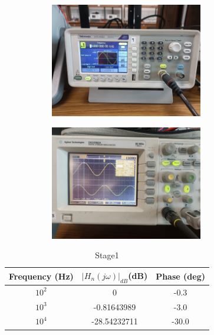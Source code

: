 \documentclass[a4paper,12pt]{article}
\begin{document}
\begin{figure}[H]
    \centering
    \begin{subfigure}{0.5\textwidth}
        \centering
        \includegraphics[height=5cm]{figs/Stage1/10000/para.jpeg}
    \end{subfigure}%
    \begin{subfigure}{0.5\textwidth}
        \centering
        \includegraphics[height=5cm]{figs/Stage1/10000/plot.jpeg}
    \end{subfigure}
\end{figure}
\begin{table}[H]
    \centering
    \begin{tabular}{|c|c|c|}
        \hline
        Frequency (Hz) &  $|H_n(j\omega)|_{dB}$(dB) & Phase (deg) \\
        \hline
        $10^2$ & 0 &-0.3 \\
        $10^3$ & -0.81643989 & -3.0 \\
        $10^4$ & -28.54232711& -30.0 \\
        \hline
    \end{tabular}
    \caption{Stage1}
\end{table}
\end{document}

